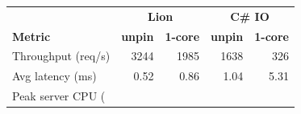 \begin{tabular}{@{}lrrrr@{}}
\toprule
 & \multicolumn{2}{c}{\textbf{Lion}} & \multicolumn{2}{c}{\textbf{C\# IO}} \\
\textbf{Metric} & \textbf{unpin} & \textbf{1-core} & \textbf{unpin} & \textbf{1-core} \\
\midrule
Throughput (req/s) & 3244 & 1985 & 1638 & 326 \\
Avg latency (ms) & 0.52 & 0.86 & 1.04 & 5.31 \\
Peak server CPU (%
\bottomrule
\end{tabular}
